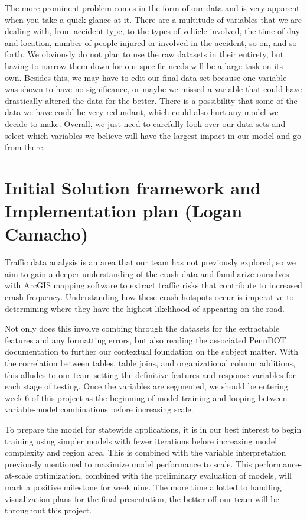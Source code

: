 \documentclass[journal]{IEEEtran}
\begin{document}
The more prominent problem comes in the form of our data and is very apparent when you take a quick glance at it. There are a multitude of variables that we are dealing with, from accident type, to the types of vehicle involved, the time of day and location, number of people injured or involved in the accident, so on, and so forth. We obviously do not plan to use the raw datasets in their entirety, but having to narrow them down for our specific needs will be a large task on its own. Besides this, we may have to edit our final data set because one variable was shown to have no significance, or maybe we missed a variable that could have drastically altered the data for the better. There is a possibility that some of the data we have could be very redundant, which could also hurt any model we decide to make. Overall, we just need to carefully look over our data sets and select which variables we believe will have the largest impact in our model and go from there.


\section{Initial Solution framework and Implementation plan (Logan Camacho)}
Traffic data analysis is an area that our team has not previously explored, so we aim to gain a deeper understanding of the crash data and familiarize ourselves with ArcGIS mapping software to extract traffic risks that contribute to increased crash frequency. Understanding how these crash hotspots occur is imperative to determining where they have the highest likelihood of appearing on the road.

Not only does this involve combing through the datasets for the extractable features and any formatting errors, but also reading the associated PennDOT documentation to further our contextual foundation on the subject matter. With the correlation between tables, table joins, and organizational column additions, this alludes to our team setting the definitive features and response variables for each stage of testing. Once the variables are segmented, we should be entering week 6 of this project as the beginning of model training and looping between variable-model combinations before increasing scale.

To prepare the model for statewide applications, it is in our best interest to begin training using simpler models with fewer iterations before increasing model complexity and region area. This is combined with the variable interpretation previously mentioned to maximize model performance to scale. This performance-at-scale optimization, combined with the preliminary evaluation of models, will mark a positive milestone for week nine. The more time allotted to handling visualization plans for the final presentation, the better off our team will be throughout this project.
\end{document}
